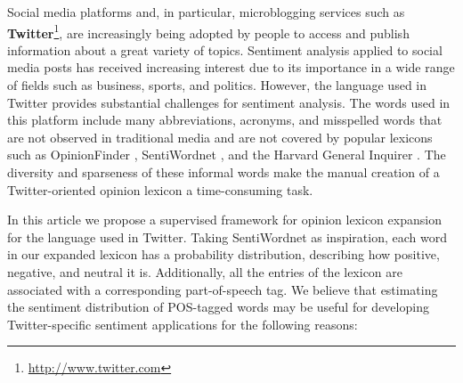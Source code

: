 \documentclass{sig-alternate}
\begin{document}
Social media platforms and, in particular, microblogging services such as \textbf{Twitter}\footnote{\url{http://www.twitter.com}}, are increasingly being adopted by people to access and publish information about a great variety of topics. Sentiment analysis applied to social media posts has received increasing interest due to its importance in a wide range of fields such as business, sports, and politics. However, the language used in Twitter provides substantial challenges for sentiment analysis. The words used in this platform include many abbreviations, acronyms, and misspelled words that are not observed in traditional media and are not covered by popular lexicons such as OpinionFinder \cite{Wilson2005}, SentiWordnet \cite{esuli2006}, and the Harvard General Inquirer \cite{stone66}. The diversity and sparseness of these informal words make the manual creation of a Twitter-oriented opinion lexicon a time-consuming task.


In this article we propose a supervised framework for opinion lexicon expansion for the language used in Twitter.  Taking SentiWordnet as inspiration, each word in our expanded lexicon has a probability distribution, describing how positive, negative, and neutral it is.  Additionally, all the entries of the lexicon are associated with a corresponding part-of-speech tag. We believe that estimating the sentiment distribution of POS-tagged words may be useful for developing Twitter-specific sentiment applications for the following reasons:
\end{document}
